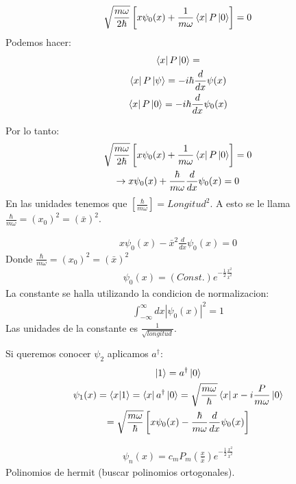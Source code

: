 \documentclass{article}
\newcommand{\caja}[3]{%
  \begin{tcolorbox}[colback=#1!5!white,colframe=#1!25!black,title=#2]
    #3
  \end{tcolorbox}%
}
\begin{document}
\begin{gather*}
  \sqrt{\frac{m\omega}{2 \hbar }} \left[x \psi_0(x) + \frac{1}{m\omega}\bra{x}P \ket{0 } \right] = 0 
\end{gather*}
Podemos hacer: 
\begin{gather*}
  \bra{x }P \ket{0 } = \\
  \bra{x }P \ket{\psi } = - i \hbar  \frac{d  }{d x }\psi(x) \\
  \bra{x }P \ket{0 } = - i \hbar \frac{d  }{d x }\psi_0(x) 
\end{gather*}

Por lo tanto: 
\begin{gather*}
  \sqrt{\frac{m\omega}{2 \hbar }} \left[x \psi_0(x) + \frac{1}{m\omega}\bra{x}P \ket{0 } \right] = 0 \\
  \rightarrow x \psi_0 (x) + \frac{\hbar }{m \omega }\frac{d  }{d x }\psi_0 (x) = 0 
\end{gather*}
En las unidades tenemos que $ \left[\frac{\hbar }{m \omega}\right] = Longitud^2  $. A esto se le llama $ \frac{\hbar }{m\omega} = (x_0 ) ^ {2 } = (\bar x )^2 $.

\caja{red}{Oscilador armonico}{
  \begin{gather*}
    x\psi_0(x) - \bar x ^2 \frac{d  }{d x} \psi_0 (x) = 0
  \end{gather*}
  Donde $ \frac{\hbar }{m\omega} = (x_0 ) ^ {2 } = (\bar x )^2 $
  \begin{gather*}
    \psi_0(x) = (Const.) e ^ {- \displaystyle\frac{1}{2} \displaystyle\frac{x ^2}{\bar x ^2}} 
  \end{gather*}
  La constante se halla utilizando la condicion de normalizacion: 
  \begin{gather*}
    \int_{-\infty}^{\infty} dx \left|\psi_0(x)\right|^2 = 1
  \end{gather*}
  Las unidades de la constante es $ \frac{1}{\sqrt{longitud} } $.
}

Si queremos conocer $ \psi_2  $ aplicamos $ a ^ {\dag } $: 
\begin{gather*}
  \ket{1 } = a ^ {\dag }\ket{0 }\\
  \psi_1(x) = \bra{x}\ket{1 } = \bra{x }a ^ {\dag }\ket{0 }= \sqrt{\frac{m \omega}{\hbar }}  \bra{x }x - i \frac{P }{m \omega}\ket{0 }\\
  = \sqrt{\frac{m \omega }{\hbar }} \left[x \psi_0(x) - \frac{\hbar }{m \omega} \frac{d  }{d x }\psi_0(x)\right]
\end{gather*}

\caja{red}{}{
  \begin{gather*}
    \psi_n (x) = c_m P_m(\frac{x }{\bar x }) e ^ {- \frac{1}{2} \frac{x ^2}{\bar x ^2}}
  \end{gather*}
  Polinomios de hermit (buscar polinomios ortogonales).
}
\end{document}
